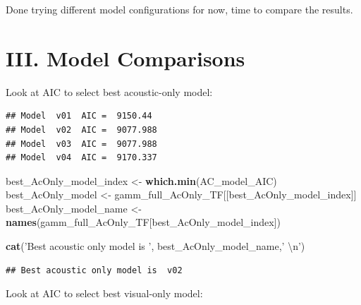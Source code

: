 \documentclass[11pt,]{article}
\newenvironment{Shaded}{\begin{snugshade}}{\end{snugshade}}
\newcommand{\KeywordTok}[1]{\textcolor[rgb]{0.13,0.29,0.53}{\textbf{{#1}}}}
\newcommand{\DecValTok}[1]{\textcolor[rgb]{0.00,0.00,0.81}{{#1}}}
\newcommand{\CharTok}[1]{\textcolor[rgb]{0.31,0.60,0.02}{{#1}}}
\newcommand{\StringTok}[1]{\textcolor[rgb]{0.31,0.60,0.02}{{#1}}}
\newcommand{\OtherTok}[1]{\textcolor[rgb]{0.56,0.35,0.01}{{#1}}}
\newcommand{\NormalTok}[1]{{#1}}
\begin{document}
Done trying different model configurations for now, time to compare the
results.

\section{III. Model Comparisons}\label{iii.-model-comparisons}

Look at AIC to select best acoustic-only model:

\begin{Shaded}
\end{Shaded}

\begin{verbatim}
## Model  v01  AIC =  9150.44 
## Model  v02  AIC =  9077.988 
## Model  v03  AIC =  9077.988 
## Model  v04  AIC =  9170.337
\end{verbatim}

\begin{Shaded}
\begin{Highlighting}[]
\NormalTok{best_AcOnly_model_index <-}\StringTok{ }\KeywordTok{which.min}\NormalTok{(AC_model_AIC)}
\NormalTok{best_AcOnly_model <-}\StringTok{ }\NormalTok{gamm_full_AcOnly_TF[[best_AcOnly_model_index]]}
\NormalTok{best_AcOnly_model_name <-}\StringTok{ }\KeywordTok{names}\NormalTok{(gamm_full_AcOnly_TF[best_AcOnly_model_index])}

\KeywordTok{cat}\NormalTok{(}\StringTok{'Best acoustic only model is '}\NormalTok{, best_AcOnly_model_name,}\StringTok{' }\CharTok{\textbackslash{}n}\StringTok{'}\NormalTok{)}
\end{Highlighting}
\end{Shaded}

\begin{verbatim}
## Best acoustic only model is  v02
\end{verbatim}

Look at AIC to select best visual-only model:
\end{document}
